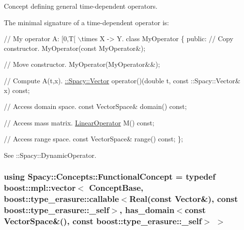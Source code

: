 Concept defining general time-\/dependent operators. 

\label{group__ConceptGroup_ga2c979d268f0ca7a436776a9631d10af7_DynamicOperatorConceptAnchor}%
\hypertarget{group__ConceptGroup_ga2c979d268f0ca7a436776a9631d10af7_DynamicOperatorConceptAnchor}{}%
The minimal signature of a time-\/dependent operator is\+: 
\begin{DoxyCode}
\textcolor{comment}{// My operator A: [0,T[ \(\backslash\)times X -> Y.}
\textcolor{keyword}{class }MyOperator
\{
\textcolor{keyword}{public}:
  \textcolor{comment}{// Copy constructor.}
  MyOperator(\textcolor{keyword}{const} MyOperator&);

  \textcolor{comment}{// Move constructor.}
  MyOperator(MyOperator&&);

  \textcolor{comment}{// Compute A(t,x).}
  \hyperlink{classSpacy_1_1Vector}{::Spacy::Vector} operator()(\textcolor{keywordtype}{double} t, const ::Spacy::Vector& x) \textcolor{keyword}{const};

  \textcolor{comment}{// Access domain space.}
  \textcolor{keyword}{const} VectorSpace& domain() \textcolor{keyword}{const};

  \textcolor{comment}{// Access mass matrix.}
  \hyperlink{group__SpacyGroup_ga584f7b9d82a844302ba0d77c3a1b6640_ga584f7b9d82a844302ba0d77c3a1b6640}{LinearOperator} M() \textcolor{keyword}{const};

  \textcolor{comment}{// Access range space.}
  \textcolor{keyword}{const} VectorSpace& range() \textcolor{keyword}{const};
\};
\end{DoxyCode}


See \+:\+:Spacy\+:\+:Dynamic\+Operator. \hypertarget{group__ConceptGroup_ga5273b50bd3e8c9a3f5a1e6b5f170836d_ga5273b50bd3e8c9a3f5a1e6b5f170836d}{}
\subsubsection[{Functional\+Concept}]{\setlength{\rightskip}{0pt plus 5cm}using {\bf Spacy\+::\+Concepts\+::\+Functional\+Concept} = typedef boost\+::mpl\+::vector$<$ Concept\+Base, boost\+::type\+\_\+erasure\+::callable$<$Real(const Vector\&), const boost\+::type\+\_\+erasure\+::\+\_\+self$>$, has\+\_\+domain$<$const Vector\+Space\&(), const boost\+::type\+\_\+erasure\+::\+\_\+self$>$ $>$}\label{group__ConceptGroup_ga5273b50bd3e8c9a3f5a1e6b5f170836d_ga5273b50bd3e8c9a3f5a1e6b5f170836d}


